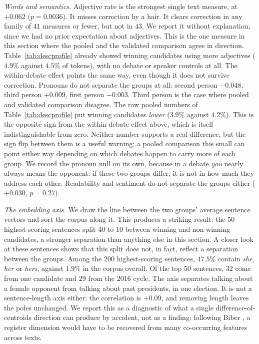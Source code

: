 \documentclass[pdflatex,sn-mathphys-num]{sn-jnl}%
\begin{document}
\emph{Words and semantics.} Adjective rate is the strongest single text
measure, at $+0.062$ ($p = 0.0036$). It misses correction by a hair. It
clears correction in any family of $41$ measures or fewer, but not in $43$.
We report it without explanation, since we had no prior expectation about
adjectives. This is the one measure in this section where the pooled and
the validated comparison agree in direction. Table~\ref{tab:descprofile}
already showed winning candidates using more adjectives ($4.9\%$ against
$4.5\%$ of tokens), with no debate or speaker controls at all. The
within-debate effect points the same way, even though it does not survive
correction. Pronouns do not separate the groups at all: second person
$-0.048$, third person $+0.009$, first person $-0.003$. Third
person is the case where pooled and validated comparison disagree. The raw
pooled numbers of Table~\ref{tab:descprofile} put winning candidates
\emph{lower} ($3.9\%$ against $4.2\%$). This is the opposite sign from the
within-debate effect above, which is itself indistinguishable from zero.
Neither number
supports a real difference, but the sign flip between them is a useful
warning: a pooled comparison this small can point either way depending on
which debates happen to carry more of each group. We record the pronoun
null on its own, because in a debate \emph{you} nearly always means the
opponent: if these two groups differ, it is not in how much they address
each other. Readability and sentiment do not separate the groups either
($+0.030$, $p = 0.27$).

\emph{The embedding axis.} We draw the line between the two groups' average
sentence vectors and sort the corpus along it. This produces a striking
result: the $50$ highest-scoring sentences split $40$ to $10$ between
winning and non-winning candidates, a stronger separation than anything else
in this section. A closer look at these sentences shows that this split does not, in fact,
reflect a separation between the groups. Among the $200$ highest-scoring sentences,
$47.5\%$ contain \emph{she}, \emph{her} or \emph{hers}, against $1.9\%$ in
the corpus overall. Of the top $50$ sentences, $32$ come from one candidate
and $29$ from the 2016 cycle. The axis separates talking about a female
opponent from talking about past presidents, in one election. It is not a
sentence-length axis either: the correlation is $+0.09$, and removing
length leaves the poles unchanged. We report this as a diagnostic of what a single
difference-of-centroids direction can produce by accident, not as a finding:
following Biber \cite{biber1988variation}, a register dimension would have
to be recovered from many co-occurring features across texts.
\end{document}
